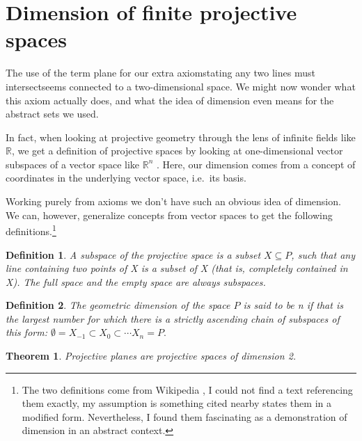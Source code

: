 \documentclass[12pt]{article}
\newtheorem{theorem}{Theorem}
\newtheorem{definition}{Definition}
\begin{document}
    \section{Dimension of finite projective spaces}

    The use of the term plane for our extra axiom\textemdash stating any two lines must intersect\textemdash seems connected to a two-dimensional space.
    We might now wonder what this axiom actually does, and what the idea of dimension even means for the abstract sets we used.

    In fact, when looking at projective geometry through the lens of infinite fields like $\mathbb{R}$,
    we get a definition of projective spaces by looking at one-dimensional vector subspaces of a vector space like $\mathbb{R}^n$ \cite{weisstein_projective_nodate}.
    Here, our dimension comes from a concept of coordinates in the underlying vector space, i.e.\ its basis.

    Working purely from axioms we don't have such an obvious idea of dimension.
    We can, however, generalize concepts from vector spaces to get the following definitions.\footnote{
        The two definitions come from Wikipedia \cite{noauthor_projective_2024},
        I could not find a text referencing them exactly, my assumption is something cited nearby states them in a modified form.
        Nevertheless, I found them fascinating as a demonstration of dimension in an abstract context.
    }

    \begin{definition}
        A subspace of the projective space is a subset $X \subseteq P$,
        such that any line containing two points of X is a subset of X (that is, completely contained in X).
        The full space and the empty space are always subspaces.
    \end{definition}

    \begin{definition}
        The geometric dimension of the space $P$ is said to be n if that is the largest number for which there is a strictly ascending chain of subspaces of this form:
        $\emptyset = X_{-1}\subset X_{0}\subset \cdots X_{n}=P.$
    \end{definition}

    \begin{theorem}
        Projective planes are projective spaces of dimension 2.
    \end{theorem}
\end{document}
